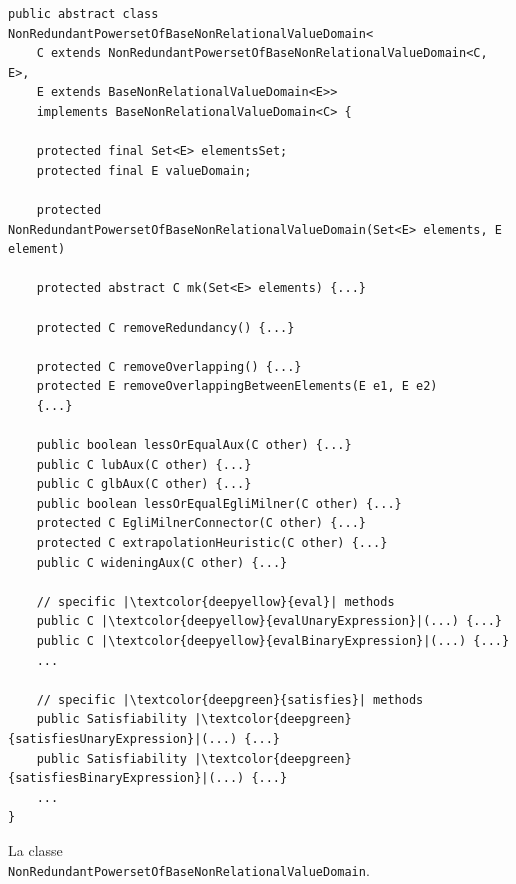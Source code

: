 \begin{algorithm}
\lstset{frame=none}
\begin{lstlisting}[belowskip=-1.1 \baselineskip, escapechar=|]
public abstract class NonRedundantPowersetOfBaseNonRelationalValueDomain<
    C extends NonRedundantPowersetOfBaseNonRelationalValueDomain<C, E>,
    E extends BaseNonRelationalValueDomain<E>> 
    implements BaseNonRelationalValueDomain<C> {
    
    protected final Set<E> elementsSet;
    protected final E valueDomain;
    
    protected NonRedundantPowersetOfBaseNonRelationalValueDomain(Set<E> elements, E element) 
    
    protected abstract C mk(Set<E> elements) {...}
    
    protected C removeRedundancy() {...}
    
    protected C removeOverlapping() {...}
    protected E removeOverlappingBetweenElements(E e1, E e2) 
    {...}
    
    public boolean lessOrEqualAux(C other) {...}
    public C lubAux(C other) {...}
    public C glbAux(C other) {...}
    public boolean lessOrEqualEgliMilner(C other) {...}
    protected C EgliMilnerConnector(C other) {...}
    protected C extrapolationHeuristic(C other) {...}
    public C wideningAux(C other) {...}   

    // specific |\textcolor{deepyellow}{eval}| methods
    public C |\textcolor{deepyellow}{evalUnaryExpression}|(...) {...}
    public C |\textcolor{deepyellow}{evalBinaryExpression}|(...) {...}
    ...

    // specific |\textcolor{deepgreen}{satisfies}| methods
    public Satisfiability |\textcolor{deepgreen}{satisfiesUnaryExpression}|(...) {...}
    public Satisfiability |\textcolor{deepgreen}{satisfiesBinaryExpression}|(...) {...}
    ...
}
\end{lstlisting}
\caption{La classe \\ \texttt{NonRedundantPowersetOfBaseNonRelationalValueDomain}.}
\label{code:nonRedundantPowersetNonRelational}
\end{algorithm}

